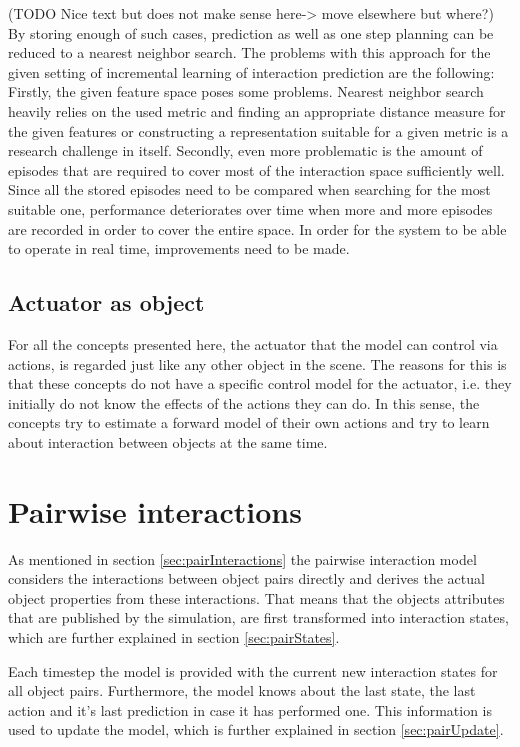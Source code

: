 (TODO Nice text but does not make sense here-> move elsewhere but where?)
By storing enough of such cases, prediction as well as one step planning can be 
reduced to a nearest neighbor search. The problems with this approach for the 
given setting of incremental learning of interaction prediction are the 
following: Firstly, the given feature space poses some problems. Nearest 
neighbor search heavily relies on the used metric and finding an appropriate 
distance measure for the given features or constructing a representation 
suitable for a given metric is a research challenge in itself. Secondly, even 
more problematic is the amount of episodes that are required to cover most of 
the interaction space sufficiently well. Since all the stored episodes need to 
be compared when searching for the most suitable one, performance deteriorates 
over time when more and more episodes are recorded in order to cover the entire 
space. In order for the system to be able to operate in real time, improvements 
need to be made.

\subsection{Actuator as object\label{sec:aao}}

For all the concepts presented here, the actuator that the model can control 
via actions, is regarded just like any other object in the scene. The reasons 
for this is that these concepts do not have a specific control model for the 
actuator, i.e. they initially do not know the effects of the actions they can 
do. In this sense, the concepts try to estimate a forward model of their own 
actions and try to learn about interaction between objects at the same time. 


\section{Pairwise interactions\label{sec:pairRealization}}

As mentioned in section \ref{sec:pairInteractions} the pairwise interaction model considers the 
interactions between object pairs directly and derives the actual object properties from these 
interactions. That means that the objects attributes that are published by the simulation, are 
first transformed into interaction states, which are further explained in section 
\ref{sec:pairStates}. 

Each timestep the model is provided with the current new interaction states 
for all object pairs. Furthermore, the model knows about the last state, the last action and it's 
last prediction in case it has performed one. This information is used to update the model, which 
is further explained in section \ref{sec:pairUpdate}. 

